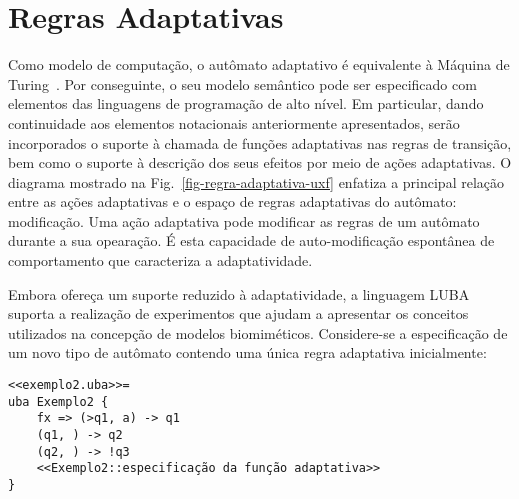 \section{Regras Adaptativas}
\label{sec:isv:regra-adaptativa}


Como modelo de computação, o autômato adaptativo é equivalente à Máquina de Turing~\cite{neto:1998}. Por conseguinte, o seu modelo semântico pode ser especificado com elementos das linguagens de programação de alto nível. Em particular, dando continuidade aos elementos notacionais anteriormente apresentados, serão incorporados o suporte à chamada de funções adaptativas nas regras de transição, bem como o suporte à descrição dos seus efeitos por meio de ações adaptativas. O diagrama mostrado na Fig.~\ref{fig-regra-adaptativa-uxf} enfatiza a principal relação entre as ações adaptativas e o espaço de regras adaptativas do autômato: modificação. Uma ação adaptativa pode modificar as regras de um autômato durante a sua opearação. É esta capacidade de auto-modificação espontânea de comportamento que caracteriza a adaptatividade.


Embora ofereça um suporte reduzido à adaptatividade, a linguagem LUBA suporta a realização de experimentos que ajudam a apresentar os conceitos utilizados na concepção de modelos biomiméticos. Considere-se a especificação de um novo tipo de autômato contendo uma única regra adaptativa inicialmente:

\begin{lstlisting}
<<exemplo2.uba>>=
uba Exemplo2 {
    fx => (>q1, a) -> q1
    (q1, ) -> q2
    (q2, ) -> !q3
    <<Exemplo2::especificação da função adaptativa>>
}
\end{lstlisting}

